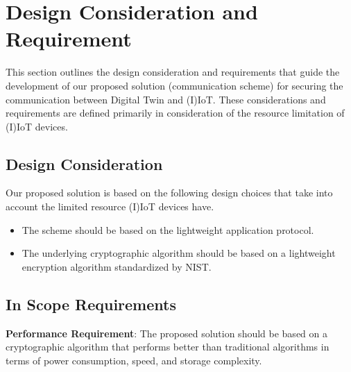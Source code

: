 % 
%  
% 


\section{Design Consideration and Requirement}
This section outlines the design consideration and requirements that guide the development of our proposed solution (communication scheme) for securing the communication between Digital Twin and (I)IoT. These considerations and requirements are defined primarily in consideration of the resource limitation of (I)IoT devices. 

\subsection{Design Consideration}
Our proposed solution is based on the following design choices that take into account the limited resource (I)IoT devices have.
\begin{itemize}
    \item The scheme should be based on the lightweight application protocol. 
    \item The underlying cryptographic algorithm should be based on a lightweight encryption algorithm standardized by NIST. 
\end{itemize}

\subsection{In Scope Requirements}
\textbf{Performance Requirement}: The proposed solution should be based on a cryptographic algorithm that performs better than traditional algorithms in terms of power consumption, speed, and storage complexity.

